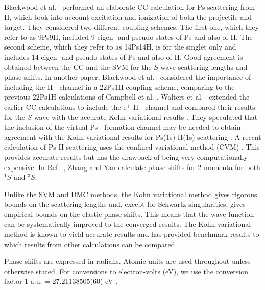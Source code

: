 \documentclass[preprint,showpacs,showkeys,preprintnumbers,amsmath,amssymb,longbibliography,pra,aps]{revtex4-1}
\begin{document}
Blackwood et al.~\cite{Blackwood2002} performed an elaborate CC calculation 
for Ps scattering from H, which took into account excitation and ionization 
of both the projectile and target. They considered two different coupling 
schemes. The first one, which they refer to as 9Ps9H, included 9 eigen- and 
pseudo-states of Ps and also of H. The second scheme, which they refer to as 
14Ps14H, is for the singlet only and includes 14 eigen- and pseudo-states of 
Ps and also of H. Good agreement is obtained between the CC
\cite{Blackwood2002} and the SVM \cite{Ivanov2002} for the $S$-wave scattering
lengths and phase shifts. In another paper, Blackwood et
al.~\cite{Blackwood2002b} considered the importance of including the H$^-$
channel in a 22Ps1H coupling scheme, comparing to the previous 22Ps1H
calculations of Campbell et al. \cite{Campbell1998}. Walters et
al.~\cite{Walters2004} extended the earlier CC calculations
\cite{Blackwood2002} to include the e$^+$-H$^-$ channel
\cite{Blackwood2002b} and compared their results for the $S$-wave with the
accurate Kohn variational results \cite{VanReeth2003}. They speculated that the
inclusion of the virtual Ps$^-$ formation channel may be needed to obtain 
agreement with the Kohn variational results for Ps(1s)-H(1s) scattering 
\cite{Blackwood2002}. A recent calculation of Ps-H scattering uses the
confined variational method (CVM) \cite{Zhang2012}. This provides accurate
results but has the drawback of being very computationally expensive. In
Ref.~\cite{Zhang2012}, Zhang and Yan calculate phase shifts for 2 momenta for
both $^1S$ and $^3S$.

Unlike the SVM and DMC methods, the Kohn variational method gives rigorous 
bounds on the scattering lengths and, except for Schwartz singularities, 
gives empirical bounds on the elastic phase shifts. This means that the wave 
function can be systematically improved to the converged results. The Kohn 
variational method is known to yield accurate results and has provided 
benchmark results \cite{VanReeth2003,VanReeth2004} to which results from 
other calculations can be compared. %

Phase shifts are expressed in radians. Atomic units are used throughout 
unless otherwise stated. For conversions to electron-volts (eV), we use the 
conversion factor 1 a.u. = {27.21138505(60) eV}
\cite{Mohr2012,*NISTConversions}.

\end{document}
